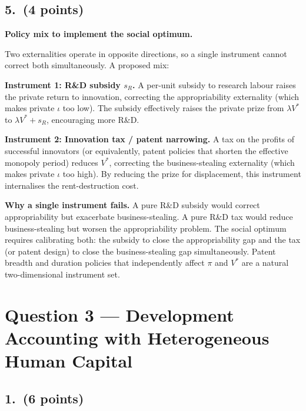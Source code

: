 \documentclass[a4paper,11pt]{article}
\begin{document}
\subsection*{5.\ (4 points)}

\begin{answerbox}
\textbf{Policy mix to implement the social optimum.}

Two externalities operate in opposite directions, so a single instrument cannot correct
both simultaneously. A proposed mix:

\textbf{Instrument 1: R\&D subsidy $s_R$.} A per-unit subsidy to research labour raises
the private return to innovation, correcting the appropriability externality (which makes
private $\iota$ too low). The subsidy effectively raises the private prize from $\lambda
V^*$ to $\lambda V^* + s_R$, encouraging more R\&D.

\textbf{Instrument 2: Innovation tax / patent narrowing.} A tax on the profits of
successful innovators (or equivalently, patent policies that shorten the effective
monopoly period) reduces $V^*$, correcting the business-stealing externality (which makes
private $\iota$ too high). By reducing the prize for displacement, this instrument
internalises the rent-destruction cost.

\textbf{Why a single instrument fails.} A pure R\&D subsidy would correct appropriability
but exacerbate business-stealing. A pure R\&D tax would reduce business-stealing but
worsen the appropriability problem. The social optimum requires calibrating both: the
subsidy to close the appropriability gap and the tax (or patent design) to close the
business-stealing gap simultaneously. Patent breadth and duration policies that
independently affect $\pi$ and $V^*$ are a natural two-dimensional instrument set.
\end{answerbox}

\clearpage

\section{Question 3 --- Development Accounting with Heterogeneous Human Capital}

\subsection*{1.\ (6 points)}
\end{document}
